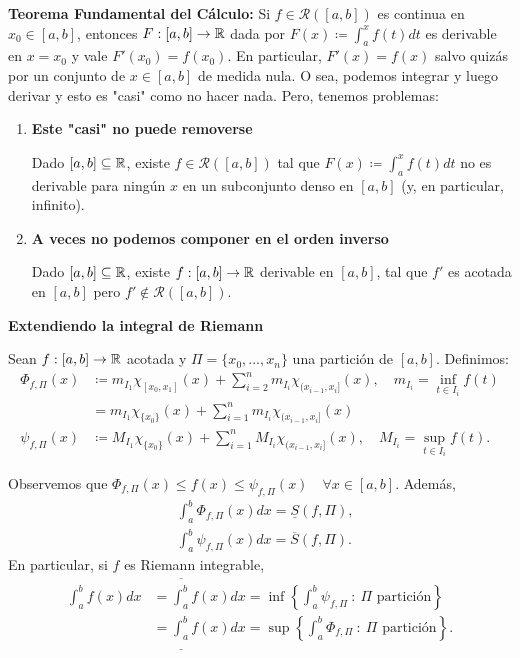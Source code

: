 
\noindent \textbf{Teorema Fundamental del Cálculo: } Si $f \in \mathcal{R}([a,b])$ es continua en $x_0 \in [a,b]$, entonces $F: [a,b] \to \mathbb{R}$ dada por $F(x) \coloneq \int_{a}^{x} f(t) dt$ es derivable en $x=x_0$ y vale $F'(x_0) = f(x_0)$. En particular, $F'(x) = f(x)$ salvo quizás por un conjunto de $x \in [a,b]$ de medida nula. O sea, podemos integrar y luego derivar y esto es "casi" como no hacer nada. Pero, tenemos problemas:

\begin{enumerate}
	\item \textbf{Este "casi" no puede removerse}
	\begin{theorem}[Hankel, 1871]
		Dado $[a,b] \subseteq \mathbb{R}$, existe $f\in\mathcal{R}([a,b])$ tal que $F(x) \coloneq \int_{a}^{x} f(t) dt$ no es derivable para ningún $x$ en un subconjunto denso en $[a,b]$ (y, en particular, infinito).
	\end{theorem}

	\item \textbf{A veces no podemos componer en el orden inverso}
	\begin{theorem}[Volterra, 1881]
		Dado $[a,b]\subseteq\mathbb{R}$, existe $f: [a,b]\to\mathbb{R}$ derivable en $[a,b]$, tal que $f'$ es acotada en $[a,b]$ pero $f' \not\in \mathcal{R} ([a,b])$.
	\end{theorem}
\end{enumerate}

\noindent \textbf{Extendiendo la integral de Riemann}

Sean $f:[a,b]\to\mathbb{R}$ acotada y $\Pi = \{ x_0,\dots,x_n \}$ una partición de $[a,b]$. Definimos:
\begin{align*}
	\Phi_{f,\Pi}(x) & \coloneq m_{I_1} \chi_{[x_0,x_1]} (x) + \sum_{i=2}^{n} m_{I_i} \chi_{(x_{i-1},x_i]}(x), \quad m_{I_i} = \inf_{t \in I_i} f(t) \\
	& = m_{I_1} \chi_{\{x_0\}}(x) + \sum_{i=1}^{n} m_{I_i} \chi_{(x_{i-1},x_i]}(x) \\
	\psi_{f,\Pi}(x) & \coloneq M_{I_1} \chi_{\{x_0\}}(x) + \sum_{i=1}^{n} M_{I_i} \chi_{(x_{i-1},x_i]}(x), \quad M_{I_i} = \sup_{t\in I_i} f(t)
.\end{align*}

Observemos que $\Phi_{f,\Pi}(x) \leq f(x) \leq \psi_{f,\Pi}(x) \quad \forall x \in [a,b]$. Además, 
\begin{align*}
	&\int_{a}^{b} \Phi_{f,\Pi}(x) dx = \underline{S}(f,\Pi), \\
	&\int_{a}^{b} \psi_{f,\Pi}(x) dx = \overline{S}(f,\Pi).
\end{align*}
\noindent En particular, si $f$ es Riemann integrable,
\begin{align*}
	\int_{a}^{b} f(x) dx & = \overline{\int_{a}^{b}} f(x) dx = \inf \left\{ \int_{a}^{b} \psi_{f,\Pi} \ : \ \Pi \text{ partición} \right\} \\
	& = \underline{ \int_{a}^{b} } f(x) dx = \sup \left\{ \int_{a}^{b} \Phi_{f,\Pi} \ : \ \Pi \text{ partición} \right\}
.\end{align*}

